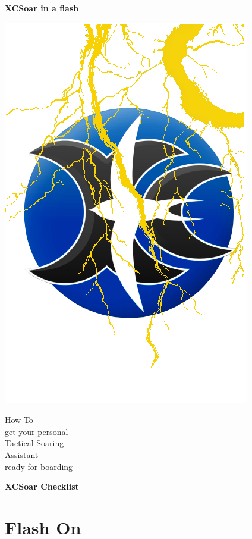 \documentclass[english,a4paper,12pt,utf8]{scrreprt}
\begin{document}
\pagestyle{empty}
\vspace*{2em}
\begin{center}
{\Huge\textbf{XCSoar in a flash}}

\vspace{0.1em}
\includegraphics[angle=0,width=0.5\linewidth,keepaspectratio='true']{figures/blitzlogo.png}

\vspace{4em}
{\Huge How To\\}
\vspace{0.3em}
{\tiny get your personal\\}
{\Huge Tactical Soaring\\ Assistant\\}
{\tiny ready for boarding}
\end{center}

\newpage
{}
\pagestyle{fancy}
\begin{center}
{\Huge\textbf{XCSoar Checklist}}
\end{center}
\section*{Flash {\color[rgb]{.9,.85,0}On}}\label{ch:flashon}
\end{document}
